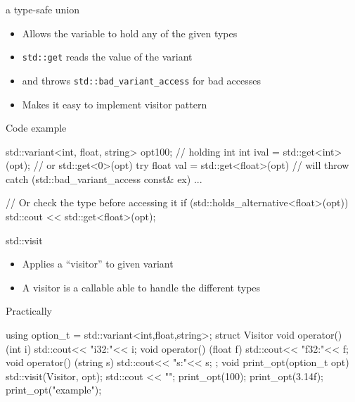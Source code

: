 \begin{frame}[fragile]
  \begin{block}{a type-safe union}
    \begin{itemize}
    \item Allows the variable to hold any of the given types
    \item \texttt{std::get} reads the value of the variant
    \item and throws \texttt{std::bad_variant_access} for bad accesses
    \item Makes it easy to implement visitor pattern
    \end{itemize}
  \end{block}
  \begin{exampleblock}{Code example}
    \small
    \begin{cppcode*}{}
      std::variant<int, float, string> opt{100}; // holding int
      int ival = std::get<int>(opt); // or std::get<0>(opt)
      try {
        float val = std::get<float>(opt) // will throw
      } catch (std::bad_variant_access const& ex) {...}

      // Or check the type before accessing it
      if (std::holds_alternative<float>(opt))
          std::cout << std::get<float>(opt);
    \end{cppcode*}
  \end{exampleblock}

\end{frame}

\begin{frame}[fragile]
  \begin{block}{std::visit}
    \begin{itemize}
    \item Applies a ``visitor'' to given variant
    \item A visitor is a callable able to handle the different types
    \end{itemize}
  \end{block}
  \begin{exampleblock}{Practically}
    \small
    \begin{cppcode*}{}
      using option_t = std::variant<int,float,string>;
      struct Visitor {
        void operator() (int i) { std::cout<< "i32:"<< i;}
        void operator() (float f) { std::cout<< "f32:"<< f;}
        void operator() (string s) { std::cout<< "s:"<< s;}
      };
      void print_opt(option_t opt) {
        std::visit(Visitor{}, opt);
        std::cout << "\n";
      }
      print_opt(100); print_opt(3.14f); print_opt("example");
    \end{cppcode*}
  \end{exampleblock}
\end{frame}

